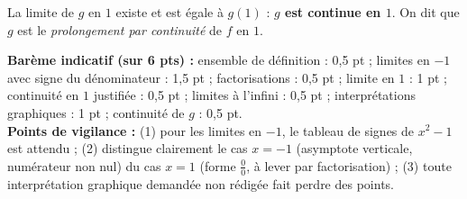\documentclass[11pt]{article}
\begin{document}
\begin{corrige}
\begin{enumerate}
La limite de $g$ en $1$ existe et est égale à $g(1)$ : \textbf{$g$ est continue en $1$}. On dit que $g$ est le \emph{prolongement par continuité} de $f$ en $1$.
\end{enumerate}
\textbf{Barème indicatif (sur 6 pts) :} ensemble de définition : 0,5 pt ; limites en $-1$ avec signe du dénominateur : 1,5 pt ; factorisations : 0,5 pt ; limite en $1$ : 1 pt ; continuité en $1$ justifiée : 0,5 pt ; limites à l'infini : 0,5 pt ; interprétations graphiques : 1 pt ; continuité de $g$ : 0,5 pt.\\
\textbf{Points de vigilance :} (1) pour les limites en $-1$, le tableau de signes de $x^2-1$ est attendu ; (2) distingue clairement le cas $x=-1$ (asymptote verticale, numérateur non nul) du cas $x=1$ (forme $\frac{0}{0}$, à lever par factorisation) ; (3) toute interprétation graphique demandée non rédigée fait perdre des points.
\end{corrige}
\end{document}
